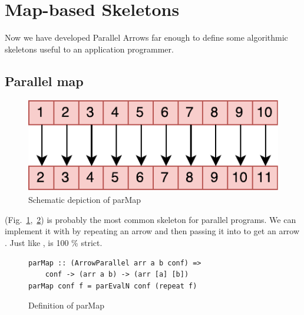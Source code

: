 
\FloatBarrier
\section{Map-based Skeletons}
\label{sec:map-skeletons}
Now we have developed Parallel Arrows far enough to define some algorithmic skeletons useful to an application programmer.
\subsection{Parallel map}
\begin{figure}[h]
	\includegraphics[scale=0.7]{images/parMap}
	\caption{Schematic depiction of parMap}
	\label{fig:parMapImg}
\end{figure}
 (Fig.~\ref{fig:parMapImg},~\ref{fig:parMap}) is probably the most common skeleton for parallel programs. We can implement it with  by repeating an arrow  and then passing it into  to get an arrow .
Just like ,  is 100 \% strict.
\begin{figure}[h]
\begin{lstlisting}[frame=htrbl]
parMap :: (ArrowParallel arr a b conf) =>
	conf -> (arr a b) -> (arr [a] [b])
parMap conf f = parEvalN conf (repeat f)
\end{lstlisting}
\caption{Definition of parMap}
\label{fig:parMap}
\end{figure}

